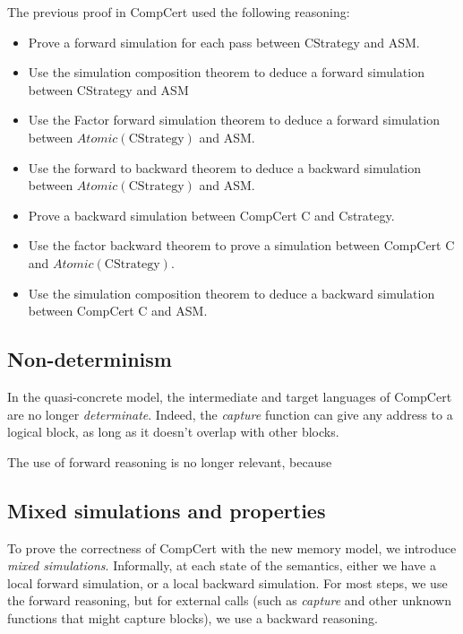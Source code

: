 The previous proof in CompCert used the following reasoning:
\begin{itemize}
\item Prove a forward simulation for each pass between CStrategy and ASM.
\item Use the simulation composition theorem to deduce a forward simulation between CStrategy and ASM
\item Use the Factor forward simulation theorem to deduce a forward simulation between $\mathit{Atomic}(\text{CStrategy})$ and ASM.
\item Use the forward to backward theorem to deduce a backward simulation between $\mathit{Atomic}(\text{CStrategy})$ and ASM.
\item Prove a backward simulation between CompCert C and Cstrategy.
\item Use the factor backward theorem to prove a simulation between CompCert C and $\mathit{Atomic}(\text{CStrategy})$.
\item Use the simulation composition theorem to deduce a backward simulation between CompCert C and ASM.
\end{itemize}

\subsection{Non-determinism}
In the quasi-concrete model, the intermediate and target languages of CompCert are no longer \textit{determinate}. Indeed, the \textit{capture} function can give any address to a logical block, as long as it doesn't overlap with other blocks.

The use of forward reasoning is no longer relevant, because 

\subsection{Mixed simulations and properties}
To prove the correctness of CompCert with the new memory model, we introduce \textit{mixed simulations}. Informally, at each state of the semantics, either we have a local forward simulation, or a local backward simulation. For most steps, we use the forward reasoning, but for external calls (such as \textit{capture} and other unknown functions that might capture blocks), we use a backward reasoning.


